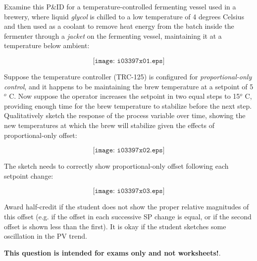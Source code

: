 

Examine this P\&ID for a temperature-controlled fermenting vessel used in a brewery, where liquid {\it glycol} is chilled to a low temperature of 4 degrees Celsius and then used as a coolant to remove heat energy from the batch inside the fermenter through a {\it jacket} on the fermenting vessel, maintaining it at a temperature below ambient:

$$\texttt{[image: i03397x01.eps]}$$

Suppose the temperature controller (TRC-125) is configured for {\it proportional-only control}, and it happens to be maintaining the brew temperature at a setpoint of 5$^{o}$ C.  Now suppose the operator increases the setpoint in two equal steps to 15$^{o}$ C, providing enough time for the brew temperature to stabilize before the next step.  Qualitatively sketch the response of the process variable over time, showing the new temperatures at which the brew will stabilize given the effects of proportional-only offset:

$$\texttt{[image: i03397x02.eps]}$$








The sketch needs to correctly show proportional-only offset following each setpoint change:

$$\texttt{[image: i03397x03.eps]}$$

Award half-credit if the student does not show the proper relative magnitudes of this offset (e.g. if the offset in each successive SP change is equal, or if the second offset is shown less than the first).  It is okay if the student sketches some oscillation in the PV trend.







{\bf This question is intended for exams only and not worksheets!}.




